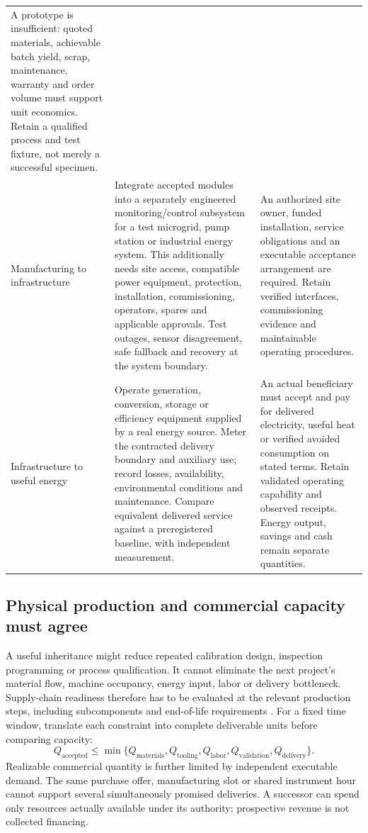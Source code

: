 \begin{longtable}{@{}P{.20\linewidth}P{.43\linewidth}P{.31\linewidth}@{}}
A prototype is insufficient: quoted materials, achievable batch yield, scrap, maintenance, warranty and order volume must support unit economics. Retain a qualified process and test fixture, not merely a successful specimen. \\[.25em]
Manufacturing to infrastructure &
Integrate accepted modules into a separately engineered monitoring/control subsystem for a test microgrid, pump station or industrial energy system. This additionally needs site access, compatible power equipment, protection, installation, commissioning, operators, spares and applicable approvals. Test outages, sensor disagreement, safe fallback and recovery at the system boundary. &
An authorized site owner, funded installation, service obligations and an executable acceptance arrangement are required. Retain verified interfaces, commissioning evidence and maintainable operating procedures. \\[.25em]
Infrastructure to useful energy &
Operate generation, conversion, storage or efficiency equipment supplied by a real energy source. Meter the contracted delivery boundary and auxiliary use; record losses, availability, environmental conditions and maintenance. Compare equivalent delivered service against a preregistered baseline, with independent measurement. &
An actual beneficiary must accept and pay for delivered electricity, useful heat or verified avoided consumption on stated terms. Retain validated operating capability and observed receipts. Energy output, savings and cash remain separate quantities. \\
\bottomrule
\end{longtable}

\subsection{Physical production and commercial capacity must agree}
A useful inheritance might reduce repeated calibration design, inspection programming or process qualification. It cannot eliminate the next project's material flow, machine occupancy, energy input, labor or delivery bottleneck. Supply-chain readiness therefore has to be evaluated at the relevant production steps, including subcomponents and end-of-life requirements \citep{doesupply}. For a fixed time window, translate each constraint into complete deliverable units before comparing capacity:
\[
 Q_{\mathrm{accepted}}\leq
 \min\{Q_{\mathrm{materials}},Q_{\mathrm{tooling}},
 Q_{\mathrm{labor}},Q_{\mathrm{validation}},Q_{\mathrm{delivery}}\}.
\]
Realizable commercial quantity is further limited by independent executable demand. The same purchase offer, manufacturing slot or shared instrument hour cannot support several simultaneously promised deliveries. A successor can spend only resources actually available under its authority; prospective revenue is not collected financing.


